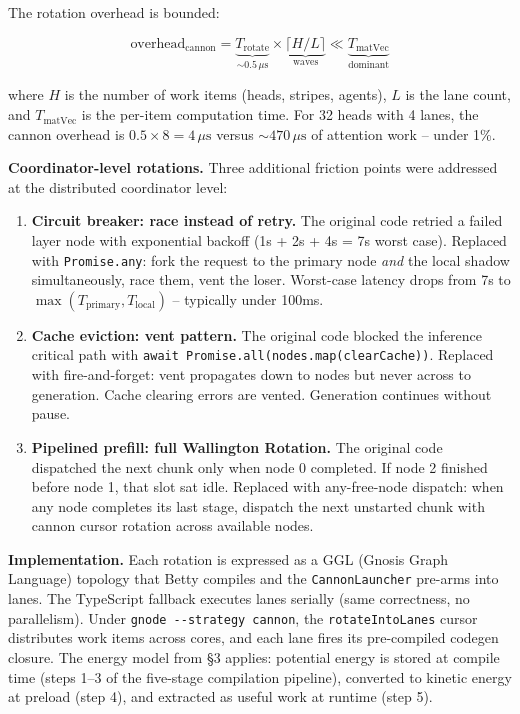 \documentclass[
  11pt,
]{article}
\begin{document}
The rotation overhead is bounded:

\[\text{overhead}_{\text{cannon}} = \underbrace{T_{\text{rotate}}}_{\sim 0.5\,\mu\text{s}} \times \underbrace{\lceil H / L \rceil}_{\text{waves}} \ll \underbrace{T_{\text{matVec}}}_{\text{dominant}}\]

where \(H\) is the number of work items (heads, stripes, agents), \(L\) is the lane count, and \(T_{\text{matVec}}\) is the per-item computation time.  For 32 heads with 4 lanes, the cannon overhead is \(0.5 \times 8 = 4\,\mu\text{s}\) versus \(\sim 470\,\mu\text{s}\) of attention work -- under 1\%.

\textbf{Coordinator-level rotations.}  Three additional friction points were addressed at the distributed coordinator level:

\begin{enumerate}
\def\labelenumi{(\arabic{enumi})}
\item
  \textbf{Circuit breaker: race instead of retry.}  The original code retried a failed layer node with exponential backoff (1s + 2s + 4s = 7s worst case).  Replaced with \texttt{Promise.any}: fork the request to the primary node \emph{and} the local shadow simultaneously, race them, vent the loser.  Worst-case latency drops from 7s to \(\max(T_{\text{primary}}, T_{\text{local}})\) -- typically under 100ms.
\item
  \textbf{Cache eviction: vent pattern.}  The original code blocked the inference critical path with \texttt{await Promise.all(nodes.map(clearCache))}.  Replaced with fire-and-forget: vent propagates down to nodes but never across to generation.  Cache clearing errors are vented.  Generation continues without pause.
\item
  \textbf{Pipelined prefill: full Wallington Rotation.}  The original code dispatched the next chunk only when node 0 completed.  If node 2 finished before node 1, that slot sat idle.  Replaced with any-free-node dispatch: when any node completes its last stage, dispatch the next unstarted chunk with cannon cursor rotation across available nodes.
\end{enumerate}

\textbf{Implementation.}  Each rotation is expressed as a GGL (Gnosis Graph Language) topology that Betty compiles and the \texttt{CannonLauncher} pre-arms into lanes.  The TypeScript fallback executes lanes serially (same correctness, no parallelism).  Under \texttt{gnode -{}-strategy cannon}, the \texttt{rotateIntoLanes} cursor distributes work items across cores, and each lane fires its pre-compiled codegen closure.  The energy model from §3 applies: potential energy is stored at compile time (steps 1--3 of the five-stage compilation pipeline), converted to kinetic energy at preload (step 4), and extracted as useful work at runtime (step 5).
\end{document}
